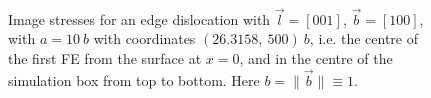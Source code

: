 \documentclass[11pt]{iopart}
\begin{document}
\begin{figure}
    ~
    ~
    \caption{Image stresses for an edge dislocation with $\vec{l} = [0 0 1]$, $\vec{b} = [1 0 0]$, with $a = 10~b$ with coordinates $(26.3158,~ 500)~b$, i.e. the centre of the first FE from the surface at $x=0$, and in the centre of the simulation box from top to bottom. Here $b = \lVert \vec{b} \rVert \equiv 1$.}
    \label{f:head_vs_ana_vs_num_eperp}
\end{figure}
\end{document}
